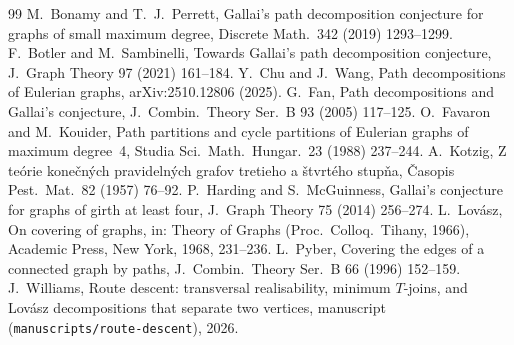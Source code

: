 \documentclass[11pt]{amsart}
\theoremstyle{definition}
\begin{document}
\begin{thebibliography}{99}
 M.~Bonamy and T.~J.~Perrett, Gallai's path decomposition conjecture for graphs of small
maximum degree, Discrete Math.\ 342 (2019) 1293--1299.
 F.~Botler and M.~Sambinelli, Towards Gallai's path decomposition conjecture, J.~Graph
Theory 97 (2021) 161--184.
 Y.~Chu and J.~Wang, Path decompositions of Eulerian graphs, arXiv:2510.12806 (2025).
 G.~Fan, Path decompositions and Gallai's conjecture, J.~Combin.\ Theory Ser.~B 93 (2005)
117--125.
 O.~Favaron and M.~Kouider, Path partitions and cycle partitions of Eulerian graphs of maximum
degree~4, Studia Sci.\ Math.\ Hungar.\ 23 (1988) 237--244.
 A.~Kotzig, Z te\'orie kone\v{c}n\'ych pravideln\'ych grafov tretieho a \v{s}tvrt\'eho
stup\v{n}a, \v{C}asopis Pest.\ Mat.\ 82 (1957) 76--92.
 P.~Harding and S.~McGuinness, Gallai's conjecture for graphs of girth at least four,
J.~Graph Theory 75 (2014) 256--274.
 L.~Lov\'asz, On covering of graphs, in: Theory of Graphs (Proc.\ Colloq.\ Tihany, 1966),
Academic Press, New York, 1968, 231--236.
 L.~Pyber, Covering the edges of a connected graph by paths, J.~Combin.\ Theory Ser.~B 66
(1996) 152--159.
 J.~Williams, Route descent: transversal realisability, minimum $T$-joins, and Lov\'asz
decompositions that separate two vertices, manuscript (\texttt{manuscripts/route-descent}), 2026.
\end{thebibliography}
\end{document}
